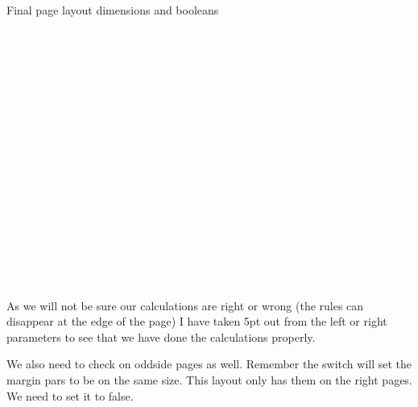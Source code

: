 \makeatletter
\newcommand\print@finalparams@cx{%
  \parindent0pt
  \par\noindent
   Final page layout dimensions and booleans
  \string\paperwidth\space\space\the\paperwidth\\%
  \string\paperheight\space\space\the\paperheight\\%
  \string\textwidth\space\space\the\textwidth\\%
  \string\textheight\space\space\the\textheight\\%
  \string\oddsidemargin\space\space\the\oddsidemargin\\%
  \string\evensidemargin\space\space\the\evensidemargin\\%
  \string\topmargin\space\space\the\topmargin\\%
  \string\headheight\space\space\the\headheight\\%
  \string\headsep\space\space\the\headsep\\%
  \string\footskip\space\space\the\footskip\\%
  \string\marginparwidth\space\space\the\marginparwidth\\%
  \string\marginparsep\space\space\the\marginparsep\\%
  \string\columnsep\space\space\the\columnsep\\%
  \string\columnseprule\space\space\the\columnseprule\\%
  \string\skip\string\footins\space\space\the\footins\\%
  \string\hoffset\space\space\the\hoffset\\%
  \string\voffset\space\space\the\voffset\\%
  \string\mag\space\space\the\mag\\%
  \if@twocolumn\string\@twocolumntrue\space\fi%
  
  \if@twoside\string\@twosidetrue\space\fi%
  
  \if@mparswitch\string\@mparswitchtrue\space\fi%
  
  \if@reversemargin\string\@reversemargintrue\space\fi%
  
}%

\print@finalparams@cx
\par
\makeatother

As we will not be sure our calculations are right or wrong (the rules can disappear at the edge of the page) I have
taken 5pt out from the left or right parameters to see that we have done the calculations properly.


We also need to check on oddside pages as well. Remember the switch \cmd{\@mparswitchfalse} will set the margin pars to be on the same size. This layout only has them on the right pages. We need to set it to false.



